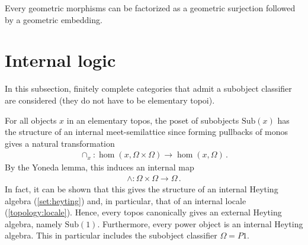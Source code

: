     \begin{theorem}[Factorization]
        Every geometric morphisms can be factorized as a geometric surjection followed by a geometric embedding.
    \end{theorem}

\section{Internal logic}\label{section:internal_logic}

    In this subsection, finitely complete categories that admit a subobject classifier are considered (they do not have to be elementary topoi).


    \begin{property}\label{topos:heyting_algebra}
        For all objects $x$ in an elementary topos, the poset of subobjects $\mathrm{Sub}(x)$ has the structure of an internal meet-semilattice since forming pullbacks of monos gives a natural transformation
        \begin{gather}
            \cap_x:\hom(x,\Omega\times\Omega)\rightarrow\hom(x,\Omega)\,.
        \end{gather}
        By the Yoneda lemma, this induces an internal map
        \begin{gather}
            \land:\Omega\times\Omega\rightarrow\Omega\,.
        \end{gather}
        In fact, it can be shown that this gives the structure of an internal Heyting algebra (\cref{set:heyting}) and, in particular, that of an internal locale (\cref{topology:locale}). Hence, every topos canonically gives an external Heyting algebra, namely $\mathrm{Sub}(1)$. Furthermore, every power object is an internal Heyting algebra. This in particular includes the subobject classifier $\Omega=P1$.
    \end{property}

